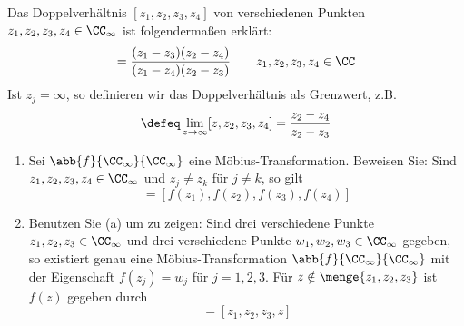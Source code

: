 \begin{exercisePage}
	
	\begin{task}
		Das Doppelverhältnis $[z_1, z_2, z_3, z_4]$ von verschiedenen Punkten $z_1, z_2, z_3, z_4 \in \CC_\infty$ ist folgendermaßen erklärt:
		\begin{equation*}
			[z_1, z_2, z_3, z_4] = \frac{(z_1 - z_3) (z_2 - z_4)}{(z_1 - z_4) (z_2 - z_3)} \qquad z_1, z_2, z_3, z_4 \in \CC
		\end{equation*}
		Ist $z_j = \infty$, so definieren wir das Doppelverhältnis als Grenzwert, z.B.
		\begin{equation*}
			[\infty, z_2, z_3, z_4] \defeq \lim_{z \to \infty} [z, z_2, z_3, z_4] = \frac{z_2 - z_4}{z_2 - z_3}
		\end{equation*}
		\begin{enumerate}[nolistsep]
			\item Sei $\abb{f}{\CC_\infty}{\CC_\infty}$ eine Möbius-Transformation. Beweisen Sie: Sind $z_1, z_2, z_3, z_4 \in \CC_\infty$ und $z_j \neq z_k$ für $j \neq k$, so gilt
			\begin{equation*}
				[z_1, z_2, z_3, z_4] = [f(z_1), f(z_2), f(z_3), f(z_4)]
			\end{equation*}
			\item Benutzen Sie (a) um zu zeigen: Sind drei verschiedene Punkte $z_1, z_2, z_3 \in \CC_\infty$ und drei verschiedene Punkte $w_1, w_2, w_3 \in \CC_\infty$ gegeben, so existiert genau eine Möbius-Transformation $\abb{f}{\CC_\infty}{\CC_\infty}$ mit der Eigenschaft $f(z_j) = w_j$ für $j=1,2,3$. Für $z \notin \menge{z_1, z_2, z_3}$ ist $f(z)$ gegeben durch
			\begin{equation*}
				[w_1, w_2, w_3, f(z)] = [z_1, z_2, z_3, z]
			\end{equation*}
		\end{enumerate}
	\end{task}


\end{exercisePage}
